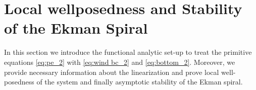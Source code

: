 \documentclass[preprint]{elsarticle}
\newtheorem{cor}[cor]{Corollary}
\numberwithin{equation}{section}
\newcommand {\R}	{\mathbb{R}}
\newcommand{\rL}{\mathrm{L}}
\newcommand{\rE}{\mathrm{E}}
\begin{document}
%

\section{Local wellposedness and Stability of the Ekman Spiral}
\label{sec:local_2}

In this section we introduce the functional analytic set-up to treat the primitive equations \eqref{eq:pe_2} with \eqref{eq:wind bc_2} and \eqref{eq:bottom_2}. Moreover, we provide necessary information about the linearization and prove local well-posedness of the system and finally asymptotic stability of the Ekman spiral. 

\smallskip 
\end{document}

